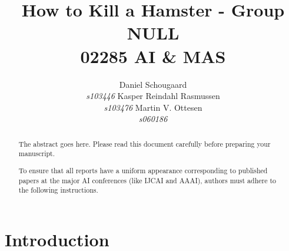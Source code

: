 \documentclass[letterpaper]{article}
\begin{document}
\title{How to Kill a Hamster - Group NULL\\ 02285 AI \& MAS}

\author{
	Daniel Schougaard \\ \textit{s103446} \And 
	Kasper Reindahl Rasmussen\\ \textit{s103476} \And 
	Martin V. Ottesen\\ \textit{s060186}  }
\maketitle



\begin{abstract}
The abstract goes here. Please read this document carefully before preparing your manuscript.

To ensure that all reports have a uniform appearance corresponding to published papers at the major AI conferences (like IJCAI and AAAI), authors must adhere to the following instructions. 
\end{abstract}

\section{Introduction}






\end{document}
